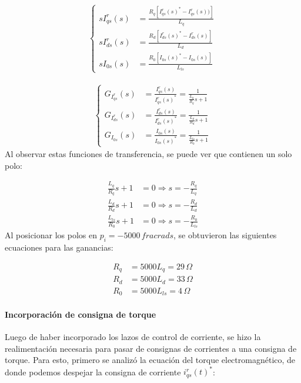 \documentclass[a4paper, 10pt, onecolumn,journal]{ieeeconf}
\begin{document}
\begin{align}
	\begin{cases}
		s{I}^r_{qs}(s) &= \frac{ R_q \left[ {I^r_{qs}(s)}^* - I^r_{qs}(s))\right]}{L_q}\\
		s{I}^r_{ds}(s) &= \frac{R_d \left[ {I^r_{ds}(s)}^* - I^r_{ds}(s) \right]}{L_d} \\ 
		s{I}_{0s}(s)   &= \frac{R_0 \left[ {I_{0s}(s)}^* - I_{0s}(s) \right]}{L_{ls}}
	\end{cases}	\label{Ecuaciones Laplace lazos de control de corriente}
\end{align}

\begin{align}
	\begin{cases}
		G_{{I}^r_{qs}}(s) &=\frac{{I}^r_{qs}(s)}{{I^r_{qs}(s)}^*} =\frac{1}{\frac{L_q}{R_q} s + 1}\\
		G_{{I}^r_{ds}}(s) &=\frac{{I}^r_{ds}(s)}{{I^r_{ds}(s)}^*} = \frac{1}{\frac{L_d}{R_d} s + 1}\\ 
		G_{{I}_{0s}}(s)   &=\frac{{I}_{0s}(s)}{{I_{0s}(s)}^*} = \frac{1}{\frac{L_{ls}}{R_0} s + 1}
	\end{cases}	\label{Funciones de Transferencia de lazos de control de corriente}
\end{align}
Al observar estas funciones de transferencia, se puede ver que contienen un solo polo:

\begin{align}
	\frac{L_q}{R_q} s + 1 &= 0 \Rightarrow s = -\frac{R_q}{L_q}\\
	\frac{L_{d}}{R_d} s + 1 &=0 \Rightarrow s = -\frac{R_d}{L_d}\\ 
	\frac{L_{ls}}{R_0} s + 1  &=0 \Rightarrow s = -\frac{R_0}{L_{ls}}
\end{align}
Al posicionar los polos en $p_{i}=-5000 \, frac{rad}{s}$, se obtuvieron las siguientes ecuaciones para las ganancias:

\begin{align}
	R_q &= 5000 L_q = 29 \, \Omega\\
	R_d &= 5000 L_d = 33 \, \Omega\\ 
	R_0 &= 5000 L_{ls} = 4 \, \Omega
\end{align}

\paragraph{\textbf{Incorporación de consigna de torque}}
Luego de haber incorporado los lazos de control de corriente, se hizo la realimentación necesaria para pasar de consignas de corrientes a una consigna de torque. Para esto, primero se analizó la ecuación del torque electromagnético, de donde podemos despejar la consigna de corriente ${i^r_{qs}(t)}^*$:
\end{document}
